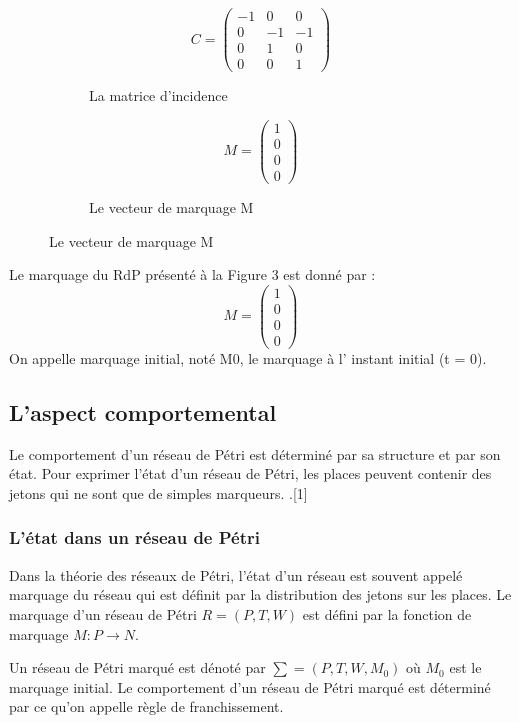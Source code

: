 \begin{exmp}
\begin{figure}[H]
	
	\begin{subfigure}[b]{0.4\textwidth}
		\[
		C=
		\begin{pmatrix}
		-1 & 0 & 0 \\
		0 & -1 & -1 \\
		0 & 1 & 0 \\
		0 & 0 & 1
		\end{pmatrix}
		\]
			\caption{La matrice d'incidence}
	\end{subfigure}
	\hfill
	\begin{subfigure}[b]{0.4\textwidth}
		\[	M=
		\begin{pmatrix}
		1  \\
		0  \\
		0  \\
		0 
		\end{pmatrix}
		\]
			\caption{Le vecteur de marquage M }
	\end{subfigure}
	
\end{figure}

Le marquage du RdP présenté à la Figure 3 est donné par : 
	\[	M=
\begin{pmatrix}
1  \\
0  \\
0  \\
0 
\end{pmatrix}
\]
On appelle marquage initial, noté M0, le marquage à l’ instant initial (t = 0). 
\end{exmp}
 

\subsection{ L'aspect comportemental }

Le comportement d'un réseau de Pétri est déterminé par sa structure et par son état. Pour exprimer l'état d'un réseau de Pétri, les places peuvent contenir des jetons qui ne sont que de simples marqueurs. .[1] 
\subsubsection{L’état dans un réseau de Pétri  }
Dans la théorie des réseaux de Pétri, l'état d'un réseau est souvent appelé marquage du réseau qui est définit par la distribution des jetons sur les places. Le marquage d'un réseau   de 
Pétri $ R= (P, T, W) $ est défini par la fonction de marquage $  M : P \to N $. 

Un réseau de Pétri marqué est dénoté par $ \sum = (P, T, W, M_{0}) $ où $M_{0}$ est le marquage initial. Le comportement d'un réseau de Pétri marqué est déterminé par ce qu'on appelle règle de franchissement. 

